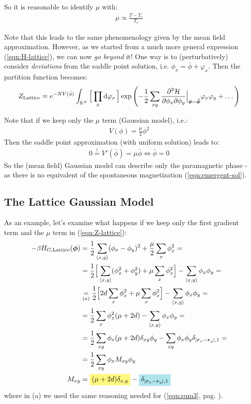 \documentclass[../../main.tex]{subfiles}
\begin{document}
So it is reasonable to identify $\mu$ with:
\begin{align*}
    \mu \propto \frac{T-T_c}{T_c} 
\end{align*}

Note that this leads to the same phenomenology given by the mean field approximation. However, as we started from a much more general expression (\ref{eqn:H-lattice}), we can now \textit{go beyond} it! One way is to (perturbatively) consider \textit{deviations} from the saddle point solution, i.e. $\phi_x = \bar{\phi} + \varphi_x$. Then the partition function becomes:
\begin{align*}
    Z_{\mathrm{Lattice}} = e^{-N V(\bar{\phi})} \int_{\mathbb{R}^N} \Big[\prod_x \dd{\varphi_x}\Big] \exp\left(-\frac{1}{2} \sum_{xy} \pdv[2]{\mathcal{H}}{\phi_x}{\phi_y} \Big|_{\bm{\phi} = \bm{\bar{\phi}}} \varphi_x \varphi_y + \dots \right)
\end{align*}  

Note that if we keep only the $\mu$ term (Gaussian model), i.e.:
\begin{align*}
    V(\phi) = \frac{\mu}{2} \phi^2 
\end{align*}
Then the saddle point approximation (with uniform solution) leads to:
\begin{align*}
    0 \overset{!}{=} V'(\bar{\phi}) = \mu \bar{\phi} \Leftrightarrow \bar{\phi} = 0
\end{align*}
So the (mean field) Gaussian model can describe only the paramagnetic phase - as there is no equivalent of the spontaneous magnetization (\ref{eqn:emergent-sol}).

\subsection{The Lattice Gaussian Model}
As an example, let's examine what happens if we keep only the first gradient term and the $\mu$ term in (\ref{eqn:Z-lattice}):
\begin{align} \nonumber
    -\beta H_{G, \mathrm{Lattice}}(\bm{\phi}) &= \frac{1}{2} \sum_{\langle x,y \rangle} (\phi_x - \phi_y)^2 + \frac{\mu}{2} \sum_x \phi_x^2 =\\ \nonumber
    &= \frac{1}{2} \Big[\sum_{\langle x,y \rangle} (\phi_x^2 + \phi_y^2)
    +\mu \sum_x \phi_x^2 \Big]
    - \sum_{\langle x,y \rangle} \phi_x \phi_y =  \\ \nonumber
    &\underset{(a)}{=}  \frac{1}{2}\Big[ 2d \sum_x \phi_x^2 + \mu \sum_x \phi_x^2 \Big]  - \sum_{\langle x,y \rangle} \phi_x \phi_y = \\ \nonumber
    &= \frac{1}{2}\sum_{x} \phi_x^2 (\mu + 2d) - \sum_{\langle x,y \rangle}  \phi_x \phi_y =\\ \nonumber
    &= \frac{1}{2} \sum_{xy} \phi_x (\mu + 2d) \delta_{xy} \phi_y - \sum_{xy} \phi_x \phi_y \delta_{|\bm{r}_x - \bm{r}_y|,1} =\\ \nonumber
    &= \frac{1}{2} \sum_{xy} \phi_x M_{xy} \phi_y \\ \label{eqn:gaussian-mtx}
    M_{xy} &= \hlc{Yellow}{(\mu + 2d)\delta_{x,y} }- \hlc{SkyBlue}{\delta_{|\bm{r}_x-\bm{r}_y|,1}}  
\end{align}
where in (a) we used the same reasoning needed for (\ref{eqn:sum3}, pag. \pageref{eqn:sum3}).
\end{document}
